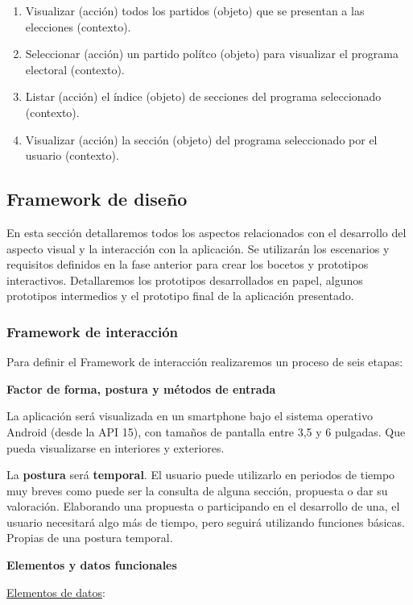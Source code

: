 \begin{enumerate}
\item Visualizar (acción) todos los partidos (objeto) que se presentan a las elecciones (contexto).
\item Seleccionar (acción) un partido polítco (objeto) para visualizar el programa electoral (contexto).
\item Listar (acción) el índice (objeto) de secciones del programa seleccionado (contexto).
\item Visualizar (acción) la sección (objeto) del programa seleccionado por el usuario (contexto).
\end{enumerate}

\subsection{Framework de diseño} \label{ssec:prototypes}

En esta sección detallaremos todos los aspectos relacionados con el desarrollo del aspecto visual y la interacción con la aplicación. Se utilizarán los escenarios y requisitos definidos en la fase anterior para crear los bocetos y prototipos interactivos. Detallaremos los prototipos desarrollados en papel, algunos prototipos intermedios y el prototipo final de la aplicación presentado.

\subsubsection{Framework de interacción}

Para definir el Framework de interacción realizaremos un proceso de seis etapas:

\textbf{Factor de forma, postura y métodos de entrada}

La aplicación será visualizada en un smartphone bajo el sistema operativo Android (desde la API 15), con tamaños de pantalla entre 3,5 y 6 pulgadas. Que pueda visualizarse en interiores y exteriores.

La \textbf{postura} será \textbf{temporal}. El usuario puede utilizarlo en periodos de tiempo muy breves como puede ser la consulta de alguna sección, propuesta o dar su valoración. Elaborando una propuesta o participando en el desarrollo de una, el usuario necesitará algo más de tiempo, pero seguirá utilizando funciones básicas. Propias de una postura temporal.

\textbf{Elementos y datos funcionales}

\underline{Elementos de datos}:

